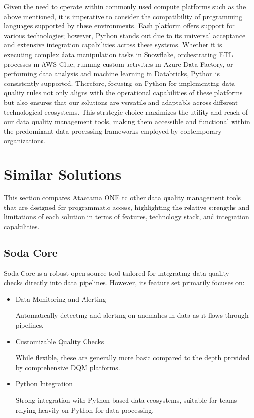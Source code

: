 Given the need to operate within commonly used compute platforms such as the above mentioned, it is imperative to consider the compatibility of programming languages supported by these environments. Each platform offers support for various technologies; however, Python stands out due to its universal acceptance and extensive integration capabilities across these systems. Whether it is executing complex data manipulation tasks in Snowflake, orchestrating ETL processes in AWS Glue, running custom activities in Azure Data Factory, or performing data analysis and machine learning in Databricks, Python is consistently supported. Therefore, focusing on Python for implementing data quality rules not only aligns with the operational capabilities of these platforms but also ensures that our solutions are versatile and adaptable across different technological ecosystems. This strategic choice maximizes the utility and reach of our data quality management tools, making them accessible and functional within the predominant data processing frameworks employed by contemporary organizations.

\section{Similar Solutions}

This section compares Ataccama ONE to other data quality management tools that are designed for programmatic access, highlighting the relative strengths and limitations of each solution in terms of features, technology stack, and integration capabilities.

\subsection{Soda Core}

Soda Core is a robust open-source tool tailored for integrating data quality checks directly into data pipelines. However, its feature set primarily focuses on:

\begin{itemize}
    \item Data Monitoring and Alerting
    
    Automatically detecting and alerting on anomalies in data as it flows through pipelines.

    \item Customizable Quality Checks

    While flexible, these are generally more basic compared to the depth provided by comprehensive DQM platforms.

    \item Python Integration
    
    Strong integration with Python-based data ecosystems, suitable for teams relying heavily on Python for data processing.
\end{itemize}

